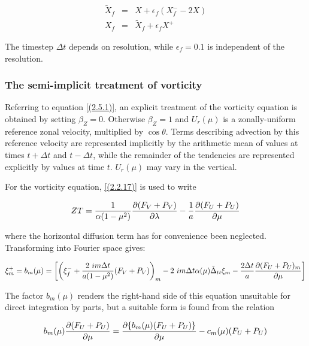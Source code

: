 \begin{eqnarray}
\tilde X_f & = & X + \epsilon _f (X^-_f - 2X)
\label{(2.5.11)}\\
X_f & = & \tilde X_f + \epsilon _f X^+
\label{(2.5.12)}
\end{eqnarray}

The timestep $\Delta t$ depends on resolution, while $\epsilon _f =
0.1$ is independent of the resolution.

\subsubsection{The semi-implicit treatment of vorticity\label{sec:timdis}}

Referring to equation \ref{(2.5.1)}, an explicit treatment of the
vorticity equation is obtained by setting $\beta_{Z} = 0$. Otherwise
$\beta_{Z} = 1$ and $U_r(\mu)$ is a zonally-uniform reference zonal
velocity, multiplied by $\cos \theta$. Terms describing advection by
this reference velocity are represented implicitly by the arithmetic
mean of values at times $t+\Delta t$ and $t-\Delta t$, while the
remainder of the tendencies are represented explicitly by values at
time $t$.  $U_r(\mu)$ may vary in the vertical.

For the vorticity equation, \ref{(2.2.17)} is used to write

\begin{equation}
ZT = \frac{1}{\alpha (1-\mu^2)}\frac {\partial (F_V+P_V)} {\partial \lambda}
- \frac{1}{a}\frac {\partial (F_U+P_U)} {\partial \mu}
\label{(2.5.19)}
\end{equation}

where the horizontal diffusion term has for convenience been
neglected. Transforming into Fourier space gives:


\begin{equation}
\xi^+_m = b_m (\mu) = \left[\left(\xi^-_f + \frac{2 \ im \Delta t}
{a(1-\mu^2)}(F_V+P_V)\right)_m 
- 2  \ im \Delta t \alpha (\mu)\tilde \Delta_{tt}\xi_m
- \frac{2 \Delta t}{a}\frac {\partial (F_U+P_U)_m} {\partial \mu}\right]
\label{(2.5.20)}
\end{equation}

The factor $b_m (\mu)$ renders the right-hand side of this equation
unsuitable for direct integration by parts, but a suitable
form is found from the relation

\begin{equation}
b_m (\mu) \frac {\partial (F_U+P_U)} {\partial \mu} = \frac {\partial \{b_m (\mu)(F_U+P_U)\}} {\partial \mu}
- c_m (\mu)(F_U+P_U)
\label{(2.5.21)}
\end{equation}


